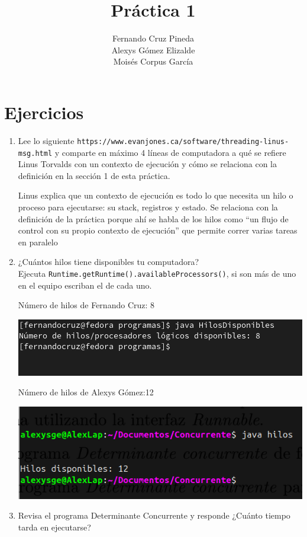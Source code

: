 \documentclass[12pt]{article}
\title{Práctica 1}
\author{Fernando Cruz Pineda \\ Alexys Gómez Elizalde \\ Moisés Corpus García}
\date{}
\begin{document}
\maketitle

\section*{Ejercicios}

\begin{enumerate}
    \item Lee lo siguiente \texttt{https://www.evanjones.ca/software/threading-linus-msg.html} y comparte en máximo 4 líneas de computadora a qué se refiere Linus Torvalds con un contexto de ejecución y cómo se relaciona con la definición en la sección 1 de esta práctica.

    Linus explica que un contexto de ejecución es todo lo que necesita un hilo o proceso para ejecutarse: su stack, registros y estado. Se relaciona con la definición de la práctica porque ahí se habla de los hilos como “un flujo de control con su propio contexto de ejecución” que permite correr varias tareas en paralelo
    
    \item ¿Cuántos hilos tiene disponibles tu computadora? \\
      Ejecuta \texttt{Runtime.getRuntime().availableProcessors()}, si son más de uno en el equipo escriban el de cada uno.

      Número de hilos de Fernando Cruz: 8

      \includegraphics[]{Fer.png}

      Número de hilos de Alexys Gómez:12

      \includegraphics[]{1Alexys.png}


    \item Revisa el programa Determinante Concurrente y responde ¿Cuánto tiempo tarda en ejecutarse?


\end{enumerate}
\end{document}
